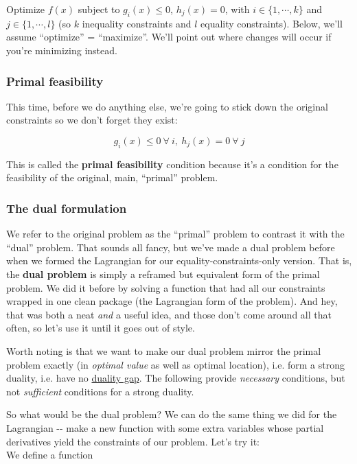 \documentclass[letterpaper,12pt]{report}
\begin{document}
Optimize \(f(x)\) subject to \(g_i(x)\leq 0\), \(h_j(x)=0\), with
\(i \in \{1, \cdots, k\}\) and \(j \in \{1, \cdots, l\}\) (so \(k\)
inequality constraints and \(l\) equality constraints). Below, we'll
assume ``optimize'' = ``maximize''. We'll point out where changes will occur
if you're minimizing instead.

\subsubsection{Primal feasibility}\label{primal-feasibility}

This time, before we do anything else, we're going to stick down the
original constraints so we don't forget they exist:

\[ g_i(x)\leq 0 \ \forall \ i, \ h_j(x) = 0 \ \forall \ j \]

This is called the \textbf{primal feasibility} condition because it's a
condition for the feasibility of the original, main, ``primal'' problem.

\subsubsection{The dual formulation}\label{the-dual-formulation}

We refer to the original problem as the ``primal'' problem to contrast it
with the ``dual'' problem. That sounds all fancy, but we've made a dual
problem before when we formed the Lagrangian for our
equality-constraints-only version. That is, the 
\textbf{dual problem}  is simply a
reframed but equivalent form of the primal problem. We did it before by
solving a function that had all our constraints wrapped in one clean
package (the Lagrangian form of the problem). And hey, that was both a
neat \emph{and} a useful idea, and those don't come around all that
often, so let's use it until it goes out of style.

Worth noting is that we want to make our dual problem mirror the primal
problem exactly (in \emph{optimal value} as well as optimal location),
i.e. form a strong duality, i.e. have no
\href{https://en.wikipedia.org/wiki/Duality_gap}{duality gap}. The
following provide \emph{necessary} conditions, but not \emph{sufficient}
conditions for a strong duality.

So what would be the dual problem? We can do the same thing we did for
the Lagrangian -\/- make a new function with some extra variables whose
partial derivatives yield the constraints of our problem. Let's try it:
\\
We define a function
\end{document}
